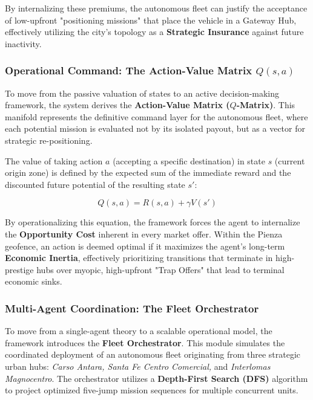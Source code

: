 By internalizing these premiums, the autonomous fleet can justify the acceptance of low-upfront "positioning missions" that place the vehicle in a Gateway Hub, effectively utilizing the city's topology as a \textbf{Strategic Insurance} against future inactivity.

\subsubsection{Operational Command: The Action-Value Matrix $Q(s,a)$}

To move from the passive valuation of states to an active decision-making framework, the system derives the \textbf{Action-Value Matrix ($Q$-Matrix)}. This manifold represents the definitive command layer for the autonomous fleet, where each potential mission is evaluated not by its isolated payout, but as a vector for strategic re-positioning. 

The value of taking action $a$ (accepting a specific destination) in state $s$ (current origin zone) is defined by the expected sum of the immediate reward and the discounted future potential of the resulting state $s'$:

\begin{equation}
    Q(s, a) = R(s, a) + \gamma V(s')
\end{equation}

By operationalizing this equation, the framework forces the agent to internalize the \textbf{Opportunity Cost} inherent in every market offer. Within the Pienza geofence, an action is deemed optimal if it maximizes the agent's long-term \textbf{Economic Inertia}, effectively prioritizing transitions that terminate in high-prestige hubs over myopic, high-upfront "Trap Offers" that lead to terminal economic sinks.

\subsubsection{Multi-Agent Coordination: The Fleet Orchestrator}

To move from a single-agent theory to a scalable operational model, the framework introduces the \textbf{Fleet Orchestrator}. This module simulates the coordinated deployment of an autonomous fleet originating from three strategic urban hubs: \textit{Carso Antara, Santa Fe Centro Comercial,} and \textit{Interlomas Magnocentro}. The orchestrator utilizes a \textbf{Depth-First Search (DFS)} algorithm to project optimized five-jump mission sequences for multiple concurrent units.

